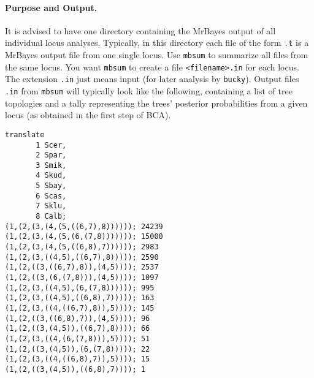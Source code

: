 \documentclass[12pt,english,final,letterpaper]{article}
\begin{document}
\paragraph{Purpose and Output.}
It is advised to have one directory containing the MrBayes output 
of all individual locus analyses. Typically, in this directory
each file of the form {\tt *.t} is a MrBayes output file from one 
single locus.  Use {\tt mbsum} to summarize all files from the
same locus. You want {\tt mbsum} to create a file 
\verb+<filename>.in+ for each locus. 
The extension \verb+.in+
just means input (for later analysis by {\tt bucky}). 
Output files {\tt *.in} from {\tt mbsum} will typically look like the following,
containing a list of tree topologies and a tally representing the trees' posterior
probabilities from a given locus (as obtained in the first step of BCA).
{\small\begin{verbatim}
translate
       1 Scer,
       2 Spar,
       3 Smik,
       4 Skud,
       5 Sbay,
       6 Scas,
       7 Sklu,
       8 Calb;
(1,(2,(3,(4,(5,((6,7),8)))))); 24239
(1,(2,(3,(4,(5,(6,(7,8))))))); 15000
(1,(2,(3,(4,(5,((6,8),7)))))); 2983
(1,(2,(3,((4,5),((6,7),8))))); 2590
(1,(2,((3,((6,7),8)),(4,5)))); 2537
(1,(2,((3,(6,(7,8))),(4,5)))); 1097
(1,(2,(3,((4,5),(6,(7,8)))))); 995
(1,(2,(3,((4,5),((6,8),7))))); 163
(1,(2,(3,((4,((6,7),8)),5)))); 145
(1,(2,((3,((6,8),7)),(4,5)))); 96
(1,(2,((3,(4,5)),((6,7),8)))); 66
(1,(2,(3,((4,(6,(7,8))),5)))); 51
(1,(2,((3,(4,5)),(6,(7,8))))); 22
(1,(2,(3,((4,((6,8),7)),5)))); 15
(1,(2,((3,(4,5)),((6,8),7)))); 1
\end{verbatim}}
 
\end{document}
